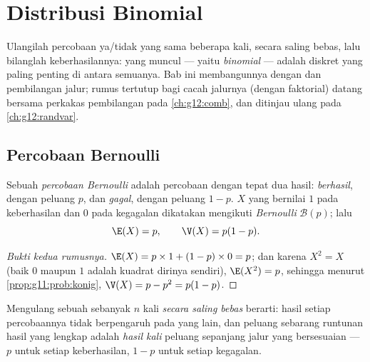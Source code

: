 \chapter{Distribusi Binomial}\label{ch:g11:binom}

Ulangilah percobaan ya/tidak yang sama beberapa kali, secara saling bebas, lalu
bilanglah keberhasilannya:  yang muncul --- yaitu \emph{binomial} ---
adalah  diskret yang paling penting di antara semuanya. Bab ini
membangunnya dengan  dan pembilangan jalur; rumus tertutup bagi cacah
jalurnya (dengan faktorial) datang bersama perkakas pembilangan pada
\cref{ch:g12:comb}, dan  ditinjau ulang pada \cref{ch:g12:randvar}.

\section{Percobaan Bernoulli}

\begin{definition}\label{def:g11:binom:bernoulli}
Sebuah \emph{percobaan Bernoulli} adalah percobaan
dengan tepat dua hasil: \emph{berhasil}, dengan peluang $p$, dan
\emph{gagal}, dengan peluang $1 - p$.  $X$ yang bernilai
$1$ pada keberhasilan dan $0$ pada kegagalan dikatakan mengikuti
\emph{ Bernoulli} $\mathcal B(p)$; lalu
\[
\E(X) = p,
\qquad
\V(X) = p(1 - p).
\]
\end{definition}

\begin{proof}[Bukti kedua rumusnya]
$\E(X) = p \times 1 + (1-p) \times 0 = p$; dan karena $X^2 = X$ (baik $0$
maupun $1$ adalah kuadrat dirinya sendiri), $\E(X^2) = p$, sehingga menurut
\cref{prop:g11:prob:konig}, $\V(X) = p - p^2 = p(1-p)$.
\end{proof}

\begin{definition}\label{def:g11:binom:repeated}
Mengulang sebuah  sebanyak $n$ kali \emph{secara saling
bebas} berarti: hasil setiap percobaannya tidak berpengaruh pada yang lain, dan
peluang sebarang runtunan hasil yang lengkap adalah \emph{hasil kali}
peluang sepanjang jalur  yang bersesuaian --- $p$ untuk setiap
keberhasilan, $1 - p$ untuk setiap kegagalan.
\end{definition}

